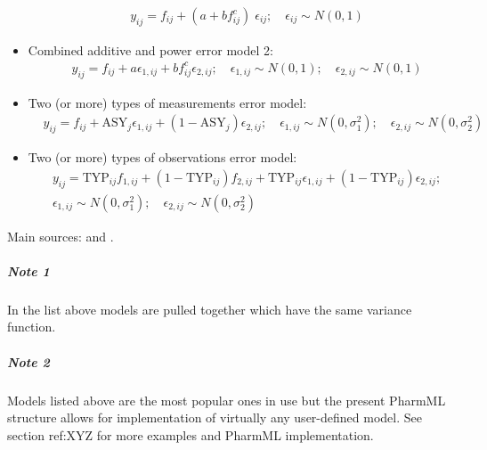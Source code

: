\begin{itemize}
\begin{align*}
& y_{ij} =  f_{ij} + (a + b f_{ij}^c) \; \epsilon_{ij}; \quad \epsilon_{ij} \sim N(0,1)
\end{align*}
\item
Combined additive and power error model 2:
\begin{align*}
& y_{ij} = f_{ij} + a\epsilon_{1,ij} + b f_{ij}^c \epsilon_{2,ij}; \quad \epsilon_{1,ij} \sim N(0,1); \quad \epsilon_{2,ij} \sim N(0,1)
\end{align*}
\item
Two (or more) types of measurements error model:
\begin{align*}
& y_{ij} = f_{ij} + \text{ASY}_j\epsilon_{1,ij} + (1-\text{ASY}_j) \epsilon_{2,ij}; \quad \epsilon_{1,ij} \sim N(0,\sigma_1^2); \quad \epsilon_{2,ij} \sim N(0,\sigma_2^2)
\end{align*}
\item
Two (or more) types of observations error model:
\begin{align*}
& y_{ij} = \text{TYP}_{ij} f_{1,ij} + (1-\text{TYP}_{ij}) f_{2,ij} + \text{TYP}_{ij}\epsilon_{1,ij} + (1-\text{TYP}_{ij}) \epsilon_{2,ij};  \\
&  \epsilon_{1,ij} \sim N(0,\sigma_1^2); \quad \epsilon_{2,ij} \sim N(0,\sigma_2^2)
\end{align*}
%
%
\end{itemize}
Main sources: \cite{NONMEM:2006aa} and \cite{POPIX:2013}.

\subparagraph{Note 1}
In the list above models are pulled together which have the same variance function.
\subparagraph{Note 2}
Models listed above are the most popular ones in use but the present PharmML structure allows for implementation of virtually any user-defined model. See section ref:XYZ for more examples and PharmML implementation.

